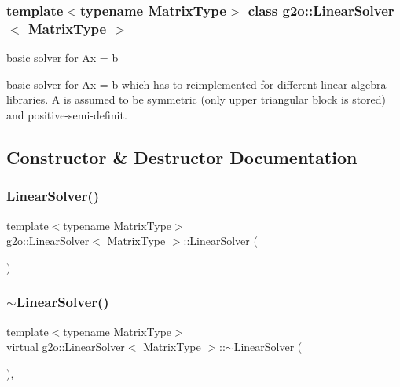 \subsubsection*{template$<$typename Matrix\+Type$>$\newline
class g2o\+::\+Linear\+Solver$<$ Matrix\+Type $>$}

basic solver for Ax = b 

basic solver for Ax = b which has to reimplemented for different linear algebra libraries. A is assumed to be symmetric (only upper triangular block is stored) and positive-\/semi-\/definit. 

\subsection{Constructor \& Destructor Documentation}
\mbox{\label{classg2o_1_1_linear_solver_a741928aa64f4b6416c9990892e3ede7a}} 
\subsubsection{\texorpdfstring{Linear\+Solver()}{LinearSolver()}}
{\footnotesize\ttfamily template$<$typename Matrix\+Type$>$ \\
\mbox{\hyperlink{classg2o_1_1_linear_solver}{g2o\+::\+Linear\+Solver}}$<$ Matrix\+Type $>$\+::\mbox{\hyperlink{classg2o_1_1_linear_solver}{Linear\+Solver}} (\begin{DoxyParamCaption}{ }\end{DoxyParamCaption})\hspace{0.3cm}{\ttfamily [inline]}}

\mbox{\label{classg2o_1_1_linear_solver_a5157e1221534fae13989c8443adab1ec}} 
\subsubsection{\texorpdfstring{$\sim$\+Linear\+Solver()}{~LinearSolver()}}
{\footnotesize\ttfamily template$<$typename Matrix\+Type$>$ \\
virtual \mbox{\hyperlink{classg2o_1_1_linear_solver}{g2o\+::\+Linear\+Solver}}$<$ Matrix\+Type $>$\+::$\sim$\mbox{\hyperlink{classg2o_1_1_linear_solver}{Linear\+Solver}} (\begin{DoxyParamCaption}{ }\end{DoxyParamCaption})\hspace{0.3cm}{\ttfamily [inline]}, {\ttfamily [virtual]}}



